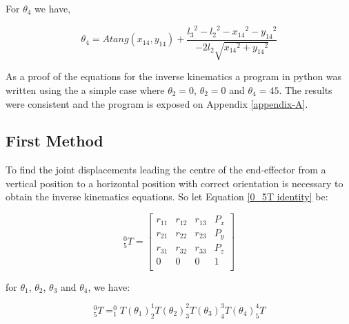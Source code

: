 \documentclass[transmag]{IEEEtran}
\begin{document}
For $\theta_4$ we have,

\begin{equation}
\theta_4 = Atang(x_{14}, y_{14}) + \frac{{l_3}^{2} - {l_2}^{2} - {x_{14}}^{2} - {y_{14}}^{2}}{-2l_{2} \sqrt{{x_{14}}^{2} + {y_{14}}^{2}}}
\end{equation}


As a proof of the equations for the inverse kinematics a program in python was written using the a simple case where $\theta_2 = 0$, $\theta_2 = 0$ and $\theta_4 = 45$. The results were consistent and the program is exposed on Appendix \ref{appendix-A}.












\clearpage
\newpage


\subsection{First Method}

To find the joint displacements leading the centre of the end-effector from a vertical position to a horizontal position with correct orientation is necessary to obtain the inverse kinematics equations. So let Equation \ref{0_5T identity} be:





\begin{eqfloat}
\begin{equation}
^0_5T =
\begin{bmatrix}
r_{11} & r_{12} & r_{13} & P_x   \\
r_{21} & r_{22} & r_{23} & P_y   \\
r_{31} & r_{32} & r_{33} & P_z   \\
0      & 0      & 0      & 1     \\
\end{bmatrix}
\label{0_5T identity}
\end{equation}

for $\theta_1$, $\theta_2$, $\theta_3$ and $\theta_4$, we have:

\begin{equation}
^0_5T = ^0_1T(\theta_1)  ^1_2T(\theta_2)  ^2_3T(\theta_3)  ^3_4T(\theta_4)  ^4_5T
\label{0_5T}
\end{equation}

\end{eqfloat}
\end{document}
